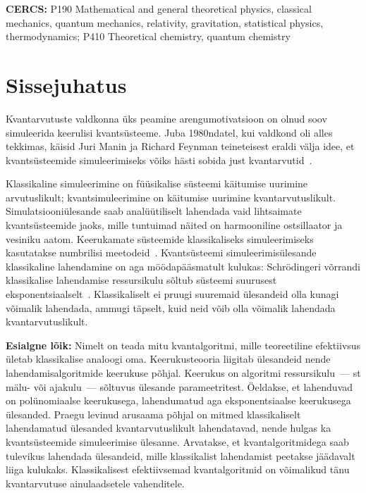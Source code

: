 \documentclass[12pt]{report}
\begin{document}
\noindent\textbf{CERCS:}
P190 Mathematical and general theoretical physics, classical mechanics, quantum
mechanics, relativity, gravitation, statistical physics, thermodynamics; P410 Theoretical chemistry, quantum chemistry

\tableofcontents

\chapter{Sissejuhatus}

Kvantarvutuste valdkonna üks peamine arengumotivatsioon on olnud soov simuleerida keerulisi kvantsüsteeme.
Juba 1980ndatel, kui valdkond oli alles tekkimas, käisid Juri Manin ja Richard Feynman teineteisest eraldi välja idee, et kvantsüsteemide simuleerimiseks võiks hästi sobida just kvantarvutid~\cite{manin, feynman}.

Klassikaline simuleerimine on füüsikalise süsteemi käitumise uurimine arvutuslikult; kvantsimuleerimine on käitumise uurimine kvantarvutuslikult.
Simulatsiooniülesande saab analüütiliselt lahendada vaid lihtsaimate kvantsüsteemide jaoks, mille tuntuimad näited on harmooniline ostsillaator ja vesiniku aatom.
Keerukamate süsteemide klassikaliseks simuleerimiseks kasutatakse numbrilisi meetodeid~\cite{szabo+ostlund, whitfield+etal2011}.
Kvantsüsteemi simuleerimisülesande klassikaline lahendamine on aga möödapääsmatult kulukas: Schrödingeri võrrandi klassikalise lahendamise ressursikulu sõltub süsteemi suurusest eksponentsiaalselt~\cite{whitfield+etal2011, mcardle+etal, cao+etal, kassal+etal}.
Klassikaliselt ei pruugi suuremaid ülesandeid olla kunagi võimalik lahendada, ammugi täpselt, kuid neid võib olla võimalik lahendada kvantarvutuslikult.

{\bf Esialgne lõik:}
Nimelt on teada mitu kvantalgoritmi, mille teoreetiline efektiivsus ületab klassikalise analoogi oma.
Keerukusteooria liigitab ülesandeid nende lahendamisalgoritmide keerukuse põhjal.
Keerukus on algoritmi ressursikulu~--- st mälu- või ajakulu~--- sõltuvus ülesande parameetritest.
Öeldakse, et lahenduvad on polünomiaalse keerukusega, lahendumatud aga eksponentsiaalse keerukusega ülesanded.
Praegu levinud arusaama põhjal on mitmed klassikaliselt lahendamatud ülesanded kvantarvutuslikult lahendatavad, nende hulgas ka kvantsüsteemide simuleerimise ülesanne.
Arvatakse, et kvantalgoritmidega saab tulevikus lahendada ülesandeid, mille klassikalist lahendamist peetakse jäädavalt liiga kulukaks.
Klassikalisest efektiivsemad kvantalgoritmid on võimalikud tänu kvantarvutuse ainulaadsetele vahenditele.
\end{document}

